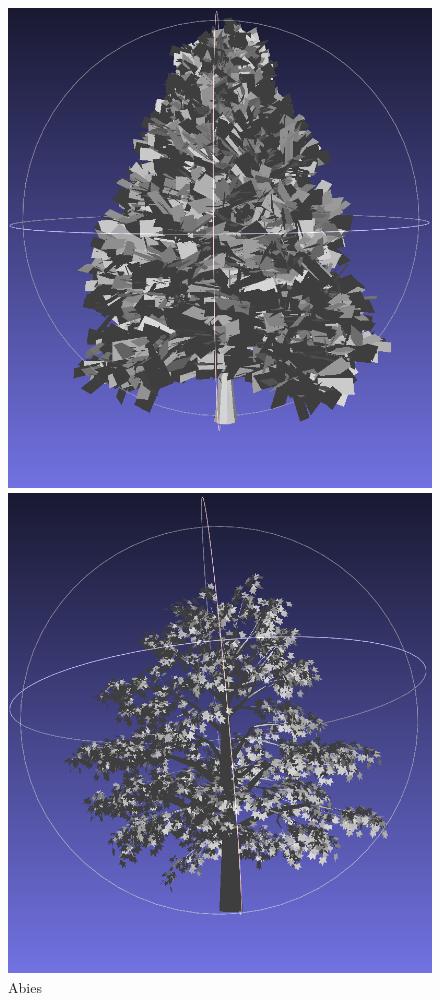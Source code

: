 \documentclass[12pt]{article}
\begin{document}
\begin{figure}[H]
    \centering
    \begin{minipage}{0.24\textwidth}
        \centering
        \includegraphics[width=\textwidth]{images/abies.png}
        \caption{Abies}
    \end{minipage}\hfill
    \begin{minipage}{0.24\textwidth}
        \centering
        \includegraphics[width=\textwidth]{images/acer.png}

\end{minipage}
\end{figure}
\end{document}
